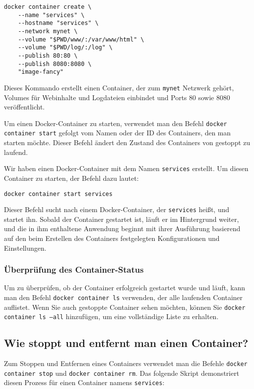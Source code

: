 \begin{verbatim}
docker container create \
    --name "services" \
    --hostname "services" \
    --network mynet \
    --volume "$PWD/www/:/var/www/html" \
    --volume "$PWD/log/:/log" \
    --publish 80:80 \
    --publish 8080:8080 \
    "image-fancy"
\end{verbatim}

Dieses Kommando erstellt einen Container, der zum \texttt{mynet} Netzwerk gehört, Volumes für Webinhalte und Logdateien einbindet und Ports 80 sowie 8080 veröffentlicht.

Um einen Docker-Container zu starten, verwendet man den Befehl \texttt{docker container start} gefolgt vom Namen oder der ID des Containers, den man starten möchte. Dieser Befehl ändert den Zustand des Containers von gestoppt zu laufend.

Wir haben einen Docker-Container mit dem Namen \texttt{services} erstellt. Um diesen Container zu starten, der Befehl dazu lautet:

\begin{verbatim}
docker container start services
\end{verbatim}

Dieser Befehl sucht nach einem Docker-Container, der \texttt{services} heißt, und startet ihn. Sobald der Container gestartet ist, läuft er im Hintergrund weiter, und die in ihm enthaltene Anwendung beginnt mit ihrer Ausführung basierend auf den beim Erstellen des Containers festgelegten Konfigurationen und Einstellungen.

\subsubsection{Überprüfung des Container-Status}

Um zu überprüfen, ob der Container erfolgreich gestartet wurde und läuft, kann man den Befehl \texttt{docker container ls} verwenden, der alle laufenden Container auflistet. Wenn Sie auch gestoppte Container sehen möchten, können Sie \texttt{docker container ls --all} hinzufügen, um eine vollständige Liste zu erhalten.

\subsection{Wie stoppt und entfernt man einen Container?}

Zum Stoppen und Entfernen eines Containers verwendet man die Befehle \texttt{docker container stop} und \texttt{docker container rm}. Das folgende Skript demonstriert diesen Prozess für einen Container namens \texttt{services}:


